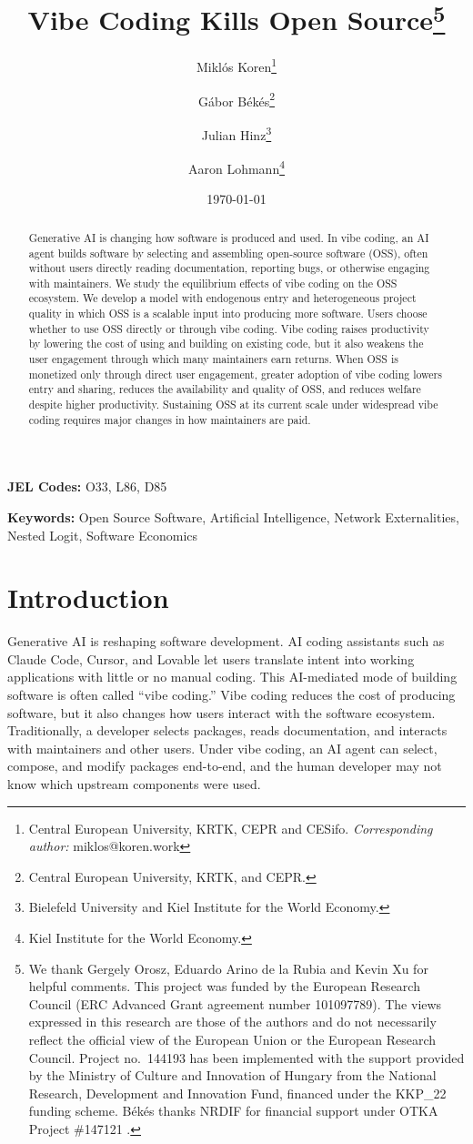 \documentclass[11pt,a4paper]{article}
\title{Vibe Coding Kills Open Source\thanks{We thank Gergely Orosz, Eduardo Arino de la Rubia and Kevin Xu for helpful comments. This project was funded by the European Research Council (ERC Advanced Grant agreement number 101097789). The views expressed in this research are those of the authors and do not necessarily reflect the official view of the European Union or the European Research Council. Project no.\ 144193 has been implemented with the support provided by the Ministry of Culture and Innovation of Hungary from the National Research, Development and Innovation Fund, financed under the KKP\_22 funding scheme.  Békés thanks NRDIF for financial support under OTKA Project \#147121 .}}
\author{
Miklós Koren\thanks{Central European University, KRTK, CEPR and CESifo. \emph{Corresponding author:} miklos@koren.work}
\and Gábor Békés\thanks{Central European University, KRTK, and CEPR.}
\and Julian Hinz\thanks{Bielefeld University and Kiel Institute for the World Economy.}
\and Aaron Lohmann\thanks{Kiel Institute for the World Economy.}
}
\date{\today}
\theoremstyle{definition}
\theoremstyle{remark}
\begin{document}
\maketitle

\vspace{2em}

\begin{abstract}
Generative AI is changing how software is produced and used. In vibe coding, an AI agent builds software by selecting and assembling open-source software (OSS), often without users directly reading documentation, reporting bugs, or otherwise engaging with maintainers. We study the equilibrium effects of vibe coding on the OSS ecosystem. We develop a model with endogenous entry and heterogeneous project quality in which OSS is a scalable input into producing more software. Users choose whether to use OSS directly or through vibe coding. Vibe coding raises productivity by lowering the cost of using and building on existing code, but it also weakens the user engagement through which many maintainers earn returns. When OSS is monetized only through direct user engagement, greater adoption of vibe coding lowers entry and sharing, reduces the availability and quality of OSS, and reduces welfare despite higher productivity. Sustaining OSS at its current scale under widespread vibe coding requires major changes in how maintainers are paid.
\end{abstract}

\vfill

\noindent\textbf{JEL Codes:} O33, L86, D85

\noindent\textbf{Keywords:} Open Source Software, Artificial Intelligence, Network Externalities, Nested Logit, Software Economics

\newpage

\section{Introduction}
\label{introduction}

Generative AI is reshaping software development. AI coding assistants such as Claude Code, Cursor, and Lovable let users translate intent into working applications with little or no manual coding. This AI-mediated mode of building software is often called ``vibe coding.'' Vibe coding reduces the cost of producing software, but it also changes how users interact with the software ecosystem. Traditionally, a developer selects packages, reads documentation, and interacts with maintainers and other users. Under vibe coding, an AI agent can select, compose, and modify packages end-to-end, and the human developer may not know which upstream components were used.
\end{document}
